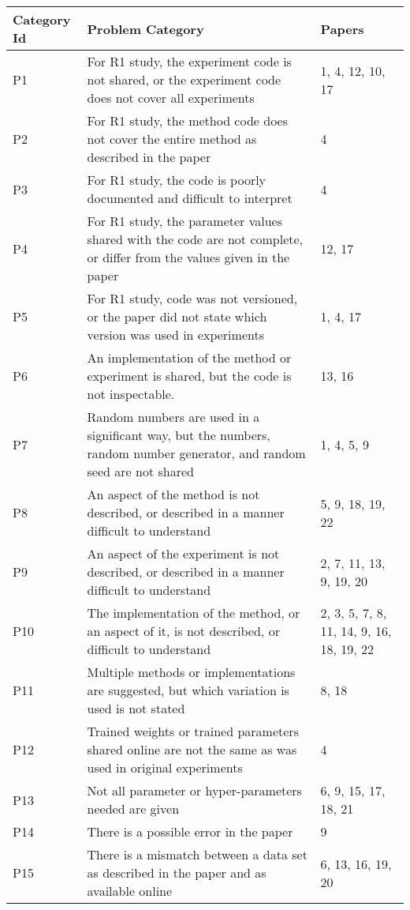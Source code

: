 \begin{tabularx}{\textwidth}{lXl}
\toprule
Category Id &                                                                                                                               Problem Category &                                    Papers \\
\midrule
 P1 &  For R1 study, the experiment code is not shared, or the experiment code does not cover all experiments &  1, 4, 12, 10, 17 \\
 P2 &  For R1 study, the method code does not cover the entire method as described in the paper &  4 \\
 P3 &  For R1 study, the code is poorly documented and difficult to interpret &  4 \\
 P4 &  For R1 study, the parameter values shared with the code are not complete, or differ from the values given in the paper &  12, 17 \\
 P5 &  For R1 study, code was not versioned, or the paper did not state which version was used in experiments &  1, 4, 17 \\
 P6 &  An implementation of the method or experiment is shared, but the code is not inspectable.  &  13, 16 \\
 P7 &  Random numbers are used in a significant way, but the numbers, random number generator, and random seed are not shared &  1, 4, 5, 9 \\
 P8 &  An aspect of the method is not described, or described in a manner difficult to understand &  5, 9, 18, 19, 22 \\
 P9 &  An aspect of the experiment is not described, or described in a manner difficult to understand &  2, 7, 11, 13, 9, 19, 20 \\
 P10 &  The implementation of the method, or an aspect of it, is not described, or difficult to understand &  2, 3, 5, 7, 8, 11, 14, 9, 16, 18, 19, 22 \\
 P11 &  Multiple methods or implementations are suggested, but which variation is used is not stated &  8, 18 \\
 P12 &  Trained weights or trained parameters shared online are not the same as was used in original experiments &  4 \\
 P13 &  Not all parameter or hyper-parameters needed are given &  6, 9, 15, 17, 18, 21 \\
 P14 &  There is a possible error in the paper &  9 \\
 P15 &  There is a mismatch between a data set as described in the paper and as available online &  6, 13, 16, 19, 20 \\

\end{tabularx}
